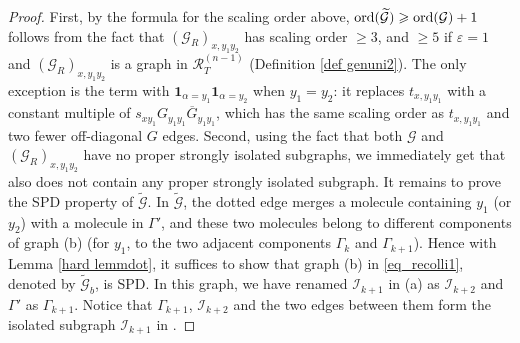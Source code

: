 \documentclass{article}
\newcommand{\1}{\mathds{1}}
\numberwithin{equation}{section}
\newcommand{\ord}{{\rm{ord}}}
\newcommand{\al}{\alpha}
\newcommand{\be}{\begin{equation}}
\newcommand{\ee}{\end{equation}}
\renewcommand{\cal}{\mathcal}
\newcommand{\wt}{\widetilde}
\renewcommand{\epsilon}{\varepsilon}
\renewcommand{\geq}{\geqslant}
\renewcommand{\ge}{\geq}
\newcommand{\dashed}{\text{diffusive}}
\theoremstyle{plain} %
\theoremstyle{remark}
\newcommand{\PT}{\mathcal R_T}
\newcommand{\Iso}{{\mathcal I}}
\begin{document}
\begin{proof}
First, by the formula for the scaling order above, $\ord(\wt{\cal G})\ge \ord(\cal G) +1 $ follows from the fact that $(\cal G_{R})_{x,y_1 y_2}$ has scaling order $\ge 3$, and $\ge 5$ if $\epsilon=1$ and $(\cal G_{R})_{x,y_1 y_2}$ is a graph in $\PT^{(n-1)}$ (Definition \ref{def genuni2}). The only exception is the term with $\mathbf 1_{\al = y_1}\mathbf 1_{\al = y_2}$ when $y_1=y_2$: it replaces $t_{x,y_1y_1}$ with a constant multiple of $s_{xy_1}G_{y_1y_1}\overline G_{y_1y_1}$, which has the same scaling order as $t_{x,y_1y_1}$ and two fewer off-diagonal $G$ edges.
Second, using the fact that both $\cal G$ and $(\cal G_R)_{x,y_1y_2}$ have no proper strongly isolated subgraphs, we immediately get that \smash{$\wt{\cal G}$} also does not contain any proper strongly isolated subgraph. 
It remains to prove the SPD property of $\wt{\cal G}$. In $\wt{\cal G}$, the dotted edge merges a molecule containing $y_1$ (or $y_2$) with a molecule in $\Gamma'$, and these two molecules belong to different components of graph (b) (for $y_1$, to the two adjacent components $\Gamma_k$ and $\Gamma_{k+1}$). Hence with Lemma \ref{hard lemmdot}, it suffices to show that graph (b) in \eqref{eq_recolli1}, denoted by $\wt{\cal G}_b$, is SPD. In this graph, we have renamed $\Iso_{k+1}$ in (a) as $\Iso_{k+2}$ and $\Gamma'$ as $\Gamma_{k+1}$. Notice that $\Gamma_{k+1}$, $\Iso_{k+2}$ and the two edges between them form the isolated subgraph $\Iso_{k+1}$ in \smash{$\wt{\cal G}_b$}.

\end{proof}
\end{document}
